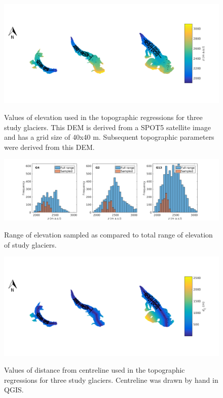 \documentclass[12pt]{article}
\begin{document}
\begin{landscape}

\begin{figure}
	\centering
	\includegraphics[height = 0.4\textwidth]{Map_elevation.png}\\
	\caption{Values of elevation used in the topographic regressions for three study glaciers. This DEM is derived from a SPOT5 satellite image and has a grid size of 40x40 m. Subsequent topographic parameters were derived from this DEM.}
	\label{map:elev}
\end{figure}

\begin{figure}
	\centering
	\includegraphics[height = 0.4\textwidth]{SampledRangeTopo_elevation.png}\\
	\caption{Range of elevation sampled as compared to total range of elevation of study glaciers.}
	\label{sampledRange:elev}
\end{figure}

\begin{figure}
	\centering
	\includegraphics[height = 0.4\textwidth]{Map_centreD.png}\\
	\caption{Values of distance from centreline used in the topographic regressions for three study glaciers. Centreline was drawn by hand in QGIS.}
	\label{map:centreD}
\end{figure}


\end{landscape}
\end{document}
